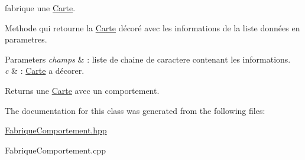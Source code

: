 fabrique une \hyperlink{class_carte}{Carte}. 

Methode qui retourne la \hyperlink{class_carte}{Carte} décoré avec les informations de la liste données en parametres.


\begin{DoxyParams}{Parameters}
{\em champs} & \-: liste de chaine de caractere contenant les informations. \\
\hline
{\em c} & \-: \hyperlink{class_carte}{Carte} a décorer. \\
\hline
\end{DoxyParams}
\begin{DoxyReturn}{Returns}
une \hyperlink{class_carte}{Carte} avec un comportement. 
\end{DoxyReturn}


The documentation for this class was generated from the following files\-:\begin{DoxyCompactItemize}
\item 
\hyperlink{_fabrique_comportement_8hpp}{Fabrique\-Comportement.\-hpp}\item 
Fabrique\-Comportement.\-cpp\end{DoxyCompactItemize}
